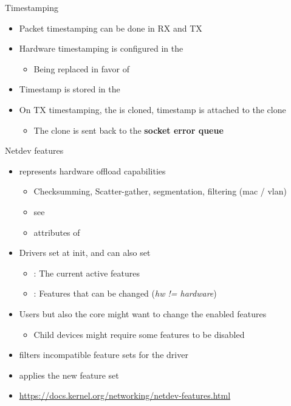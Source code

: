 \begin{frame}{Timestamping}
	\begin{itemize}
		\item Packet timestamping can be done in RX and TX
		\item Hardware timestamping is configured in the 
			\begin{itemize}
				\item Being replaced in favor of 
			\end{itemize}
		\item Timestamp is stored in the 
		\item On TX timestamping, the  is cloned, timestamp is attached to the clone
			\begin{itemize}
				\item The clone is sent back to the \textbf{socket error queue}
			\end{itemize}
	\end{itemize}
\end{frame}

\begin{frame}{Netdev features}
	\begin{itemize}
		\item {} represents hardware offload capabilities
			\begin{itemize}
				\item Checksumming, Scatter-gather, segmentation, filtering (mac / vlan)
				\item see 
				\item attributes of 
			\end{itemize}
		\item Drivers set  at init, and can also set 
			\begin{itemize}
				\item {} : The current active features
				\item {} : Features that can be changed (\textit{hw != hardware})
			\end{itemize}
		\item Users but also the core might want to change the enabled features
			\begin{itemize}
				\item Child devices might require some features to be disabled
			\end{itemize}
		\item {} filters incompatible feature sets for the driver
		\item {} applies the new feature set
		\item \url{https://docs.kernel.org/networking/netdev-features.html}
	\end{itemize}
\end{frame}

